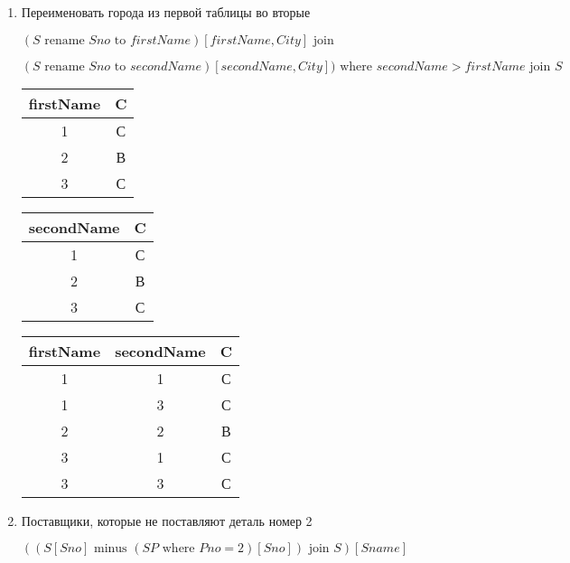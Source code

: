 \documentclass[a4paper, 14pt]{report}
\begin{document}
\begin{enumerate}
        \item Переименовать города из первой таблицы во вторые

            $(S \text{ rename } Sno \text{ to } firstName)[firstName, City] \text{ join }$
            
            $(S \text{ rename } Sno \text{ to } secondName)[secondName, City]) \text{ where } secondName > firstName \text{ join } S$

            \begin{tabular}{|c|c|}
                \hline
                firstName & C \\
                \hline
                1 & С \\
                2 & В \\
                3 & С \\
                \hline
            \end{tabular}

            \begin{tabular}{|c|c|}
                \hline
                secondName & C \\
                \hline
                1 & С \\
                2 & В \\
                3 & С \\
                \hline
            \end{tabular}

            \begin{tabular}{|c|c|c|}
                \hline
                firstName & secondName & C \\
                \hline
                1 & 1 & С \\
                1 & 3 & С \\
                2 & 2 & В \\
                3 & 1 & С \\
                3 & 3 & С \\
                \hline
            \end{tabular}

        \item Поставщики, которые не поставляют деталь номер 2

            $((S[Sno] \text{ minus } (SP \text{ where } Pno=2)[Sno]) \text{ join } S)[Sname]$

    \end{enumerate}
\end{document}
